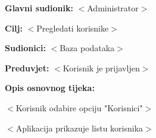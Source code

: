 					\noindent {}
					\begin{packed_item}

						\item \textbf{Glavni sudionik: }$<$Administrator$>$
						\item  \textbf{Cilj:} $<$Pregledati korisnike$>$
						\item  \textbf{Sudionici:} $<$Baza podataka$>$
						\item  \textbf{Preduvjet:} $<$Korisnik je prijavljen$>$
						\item  \textbf{Opis osnovnog tijeka:}

						\item[] \begin{packed_enum}

							\item $<$Korisnik odabire opciju "Korisnici"$>$
							\item $<$Aplikacija prikazuje listu korisnika$>$
						\end{packed_enum}
					\end{packed_item}

